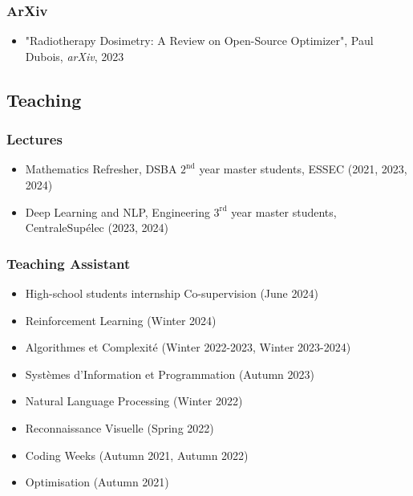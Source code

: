 \subsubsection*{ArXiv}
\begin{itemize}
	\item "Radiotherapy Dosimetry: A Review on Open-Source Optimizer",
	Paul Dubois, \textit{arXiv}, 2023
\end{itemize}

\subsection*{Teaching}
\subsubsection*{Lectures}
\begin{itemize}
	\item Mathematics Refresher, DSBA $2^\text{nd}$ year master students, ESSEC (2021, 2023, 2024)
	\item Deep Learning and NLP, Engineering $3^\text{rd}$ year master students, CentraleSupélec (2023, 2024)
\end{itemize}

\subsubsection*{Teaching Assistant}
\begin{itemize}
	\item High-school students internship Co-supervision (June 2024)
	\item Reinforcement Learning (Winter 2024)
	\item Algorithmes et Complexité (Winter 2022-2023, Winter 2023-2024)
	\item Systèmes d'Information et Programmation (Autumn 2023)
	\item Natural Language Processing (Winter 2022)
	\item Reconnaissance Visuelle (Spring 2022)
	\item Coding Weeks (Autumn 2021, Autumn 2022)
	\item Optimisation (Autumn 2021)
\end{itemize}


